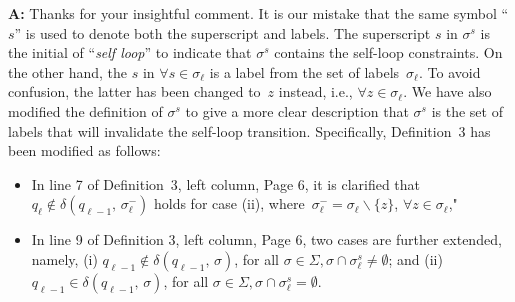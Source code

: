 \documentclass[10pt]{article}
\begin{document}
\textbf{A:} Thanks for your insightful comment. It is our mistake that the same symbol ``$s$''
is used to denote both the superscript and labels.
The superscript $s$ in $\sigma^s$ is the initial of ``\emph{self loop}''
to indicate that $\sigma^s$ contains the self-loop constraints.
On the other hand, the $s$ in $\forall{s}\in{\sigma_{\ell}}$
is a label from the set of labels~$\sigma_{\ell}$.
To avoid confusion,
the latter has been changed to~$z$ instead, i.e., $\forall{z}\in{\sigma_{\ell}}$.
We have also modified the definition of $\sigma^s$ to
give a more clear description that $\sigma^s$ is the set of labels
that will invalidate the self-loop transition.
Specifically, Definition~3 has been modified as follows:
\begin{itemize}
\item In line 7 of Definition~3, left column, Page 6,
  it is clarified that $q_{\ell} \notin \delta(q_{\ell-1},\,\sigma^-_\ell)$
  holds for case (ii), where~{$\sigma^-_\ell =  \sigma_\ell \backslash \{z\}$, $\forall z\in \sigma_\ell$},"

\item In line 9 of Definition 3, left column, Page 6,
  two cases are further extended, namely,
(i) $q_{\ell-1} \notin \delta(q_{\ell-1},\,\sigma)$, for all $\sigma\in\Sigma, \sigma\cap\sigma^{s}_\ell\neq\emptyset$;
and (ii) $q_{\ell-1} \in \delta(q_{\ell-1},\,\sigma)$, for all  $\sigma\in\Sigma, \sigma\cap\sigma^{s}_\ell=\emptyset$.
\end{itemize}
\end{document}
